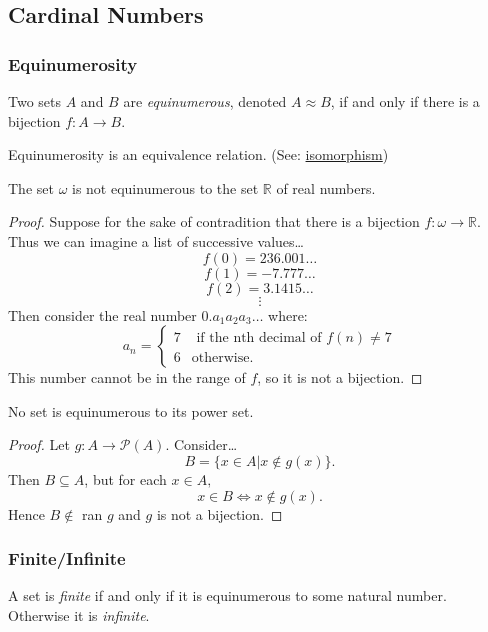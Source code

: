 \subsection{Cardinal Numbers}\label{cardinalnumbers}

\subsubsection{Equinumerosity}
Two sets $A$ and $B$ are \emph{equinumerous}, denoted $A \approx B$, if and only if there is a bijection $f : A \rightarrow B.$ \label{equinumerous}

\begin{proposition}
Equinumerosity is an equivalence relation. (See: \hyperref[isomorphism]{isomorphism})
\end{proposition}

\begin{theorem}[Diagonalization]\label{diagonalization}
The set $\omega$ is not equinumerous to the set $\mathbb{R}$ of real numbers.
\end{theorem}

\begin{proof}\renewcommand{\qedsymbol}{\Lightning}
Suppose for the sake of contradition that there is a bijection $f: \omega \rightarrow \mathbb{R}$. Thus we can imagine a list of successive values\dots
$$f(0) = 236.001\dots$$
$$f(1) = -7.777\dots$$
$$f(2) = 3.1415\dots$$
$$\vdots$$
Then consider the real number $0.a_1a_2a_3\dots$ where:
\[
	a_n = \begin{cases}
				7 & \textrm{ if the nth decimal of } f(n) \neq 7\\
				6 & \textrm{otherwise.}
		  \end{cases}
\]
This number cannot be in the range of $f$, so it is not a bijection.
\end{proof}

\begin{theorem}[Diagonalization]
No set is equinumerous to its power set.
\end{theorem}

\begin{proof}
Let $g: A \rightarrow \mathcal{P}(A)$. Consider\dots
$$B = \{ x \in A | x \not \in g(x) \}.$$
Then $B \subseteq A$, but for each $x \in A,$
$$x \in B \Leftrightarrow x \not\in g(x).$$
Hence $B \not\in$ ran $g$ and $g$ is not a bijection.
\end{proof}

\subsubsection{Finite/Infinite}
A set is \emph{finite}\label{infinite} if and only if it is equinumerous to some natural number. Otherwise it is \emph{infinite}\label{infinite}.

